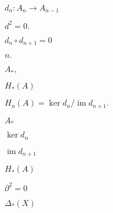 \documentclass[10pt]{book}
\begin{document}
\begin{mdSnippets}
\begin{mdInlineSnippet}[11b6688f633f1839d91ea2501f3293c0]%
$d_n: A_n \to A_{n-1}$\end{mdInlineSnippet}%
\begin{mdInlineSnippet}[a630ae745659559adf449bf608149147]%
$d^2 = 0.$\end{mdInlineSnippet}%
\begin{mdInlineSnippet}[27178de89c53d06da7205800993e6232]%
$d_n \circ d_{n+1} = 0$\end{mdInlineSnippet}%
\begin{mdInlineSnippet}[36cb6ed5283e452800c275dd6934aecc]%
$n.$\end{mdInlineSnippet}%
\begin{mdInlineSnippet}%
$A_*,$\end{mdInlineSnippet}%
\begin{mdInlineSnippet}[a39f07818df5450f4892bfb83a9c660d]%
$H_*(A)$\end{mdInlineSnippet}%
\begin{mdInlineSnippet}[83af0cb0d878fe72fb2a84e162a4ddeb]%
$H_n(A) = \ker d_n / \operatorname{im} d_{n+1}.$\end{mdInlineSnippet}%
\begin{mdInlineSnippet}[bfb8158d29b977d384fd028bb66c6290]%
$A_*$\end{mdInlineSnippet}%
\begin{mdInlineSnippet}%
$\ker d_n$\end{mdInlineSnippet}%
\begin{mdInlineSnippet}[8828f81d05873bfabafca1702ae094c7]%
$\operatorname{im} d_{n+1}$\end{mdInlineSnippet}%
\begin{mdInlineSnippet}[a39f07818df5450f4892bfb83a9c660d]%
$H_*(A)$\end{mdInlineSnippet}%
\begin{mdInlineSnippet}[3ffcd86d6a26df8410ee6347d228fa17]%
$\partial^2 = 0$\end{mdInlineSnippet}%
\begin{mdInlineSnippet}[c61c1f5a0477f12628e1bcd5842fc71f]%
$\Delta_*(X)$\end{mdInlineSnippet}%

\end{mdSnippets}
\end{document}
